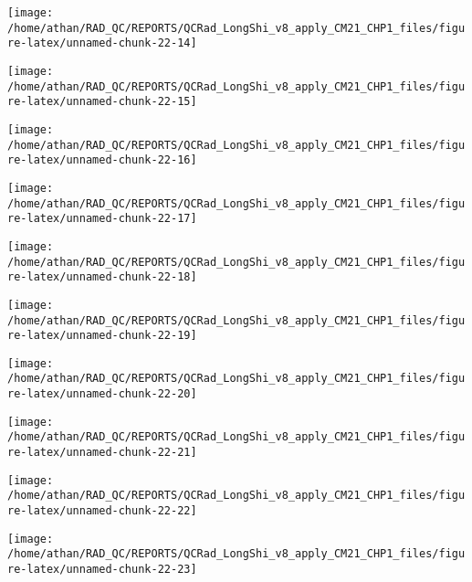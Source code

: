 \documentclass[
  10pt,
  a4paper,oneside]{article}
\begin{document}
\begin{center}\texttt{[image: /home/athan/RAD\_QC/REPORTS/QCRad\_LongShi\_v8\_apply\_CM21\_CHP1\_files/figure-latex/unnamed-chunk-22-14]} \end{center}

\begin{center}\texttt{[image: /home/athan/RAD\_QC/REPORTS/QCRad\_LongShi\_v8\_apply\_CM21\_CHP1\_files/figure-latex/unnamed-chunk-22-15]} \end{center}

\begin{center}\texttt{[image: /home/athan/RAD\_QC/REPORTS/QCRad\_LongShi\_v8\_apply\_CM21\_CHP1\_files/figure-latex/unnamed-chunk-22-16]} \end{center}

\begin{center}\texttt{[image: /home/athan/RAD\_QC/REPORTS/QCRad\_LongShi\_v8\_apply\_CM21\_CHP1\_files/figure-latex/unnamed-chunk-22-17]} \end{center}

\begin{center}\texttt{[image: /home/athan/RAD\_QC/REPORTS/QCRad\_LongShi\_v8\_apply\_CM21\_CHP1\_files/figure-latex/unnamed-chunk-22-18]} \end{center}

\begin{center}\texttt{[image: /home/athan/RAD\_QC/REPORTS/QCRad\_LongShi\_v8\_apply\_CM21\_CHP1\_files/figure-latex/unnamed-chunk-22-19]} \end{center}

\begin{center}\texttt{[image: /home/athan/RAD\_QC/REPORTS/QCRad\_LongShi\_v8\_apply\_CM21\_CHP1\_files/figure-latex/unnamed-chunk-22-20]} \end{center}

\begin{center}\texttt{[image: /home/athan/RAD\_QC/REPORTS/QCRad\_LongShi\_v8\_apply\_CM21\_CHP1\_files/figure-latex/unnamed-chunk-22-21]} \end{center}

\begin{center}\texttt{[image: /home/athan/RAD\_QC/REPORTS/QCRad\_LongShi\_v8\_apply\_CM21\_CHP1\_files/figure-latex/unnamed-chunk-22-22]} \end{center}

\begin{center}\texttt{[image: /home/athan/RAD\_QC/REPORTS/QCRad\_LongShi\_v8\_apply\_CM21\_CHP1\_files/figure-latex/unnamed-chunk-22-23]} \end{center}
\end{document}
